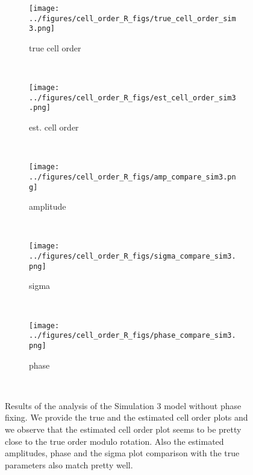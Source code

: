 \documentclass[11pt]{article}
\begin{document}
  \begin{figure*}[ht]
    \centering
     \begin{subfigure}[t]{0.5\textwidth}
        \centering
        \texttt{[image: ../figures/cell\_order\_R\_figs/true\_cell\_order\_sim3.png]}
        \caption{true cell order}
    \end{subfigure}%
    ~
    \begin{subfigure}[t]{0.5\textwidth}
        \centering
        \texttt{[image: ../figures/cell\_order\_R\_figs/est\_cell\_order\_sim3.png]}
        \caption{est. cell order}
    \end{subfigure}\\

     \begin{subfigure}[t]{0.5\textwidth}
        \centering
        \texttt{[image: ../figures/cell\_order\_R\_figs/amp\_compare\_sim3.png]}
        \caption{amplitude}
    \end{subfigure}%
    ~
       \begin{subfigure}[t]{0.5\textwidth}
        \centering
        \texttt{[image: ../figures/cell\_order\_R\_figs/sigma\_compare\_sim3.png]}
        \caption{sigma}
    \end{subfigure}\\

     \begin{subfigure}[t]{0.5\textwidth}
        \centering
        \texttt{[image: ../figures/cell\_order\_R\_figs/phase\_compare\_sim3.png]}
        \caption{phase}
    \end{subfigure}\\

    \caption{Results of the analysis of the Simulation 3 model without phase fixing. We provide the true and the estimated cell order plots and we observe that the estimated cell order plot seems to be pretty close to the true order modulo rotation. Also the estimated amplitudes, phase and the sigma plot comparison with the true parameters also match pretty well.}
 \label{fig:fig8}
 \end{figure*}
\end{document}
